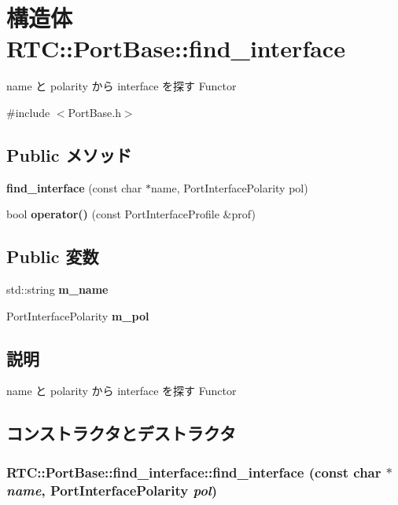 \section{構造体 RTC::PortBase::find\_\-interface}
\label{structRTC_1_1PortBase_1_1find__interface}


name と polarity から interface を探す Functor  




{\ttfamily \#include $<$PortBase.h$>$}

\subsection*{Public メソッド}
\begin{DoxyCompactItemize}
\item 
{\bf find\_\-interface} (const char $\ast$name, PortInterfacePolarity pol)
\item 
bool {\bf operator()} (const PortInterfaceProfile \&prof)
\end{DoxyCompactItemize}
\subsection*{Public 変数}
\begin{DoxyCompactItemize}
\item 
std::string {\bf m\_\-name}
\item 
PortInterfacePolarity {\bf m\_\-pol}
\end{DoxyCompactItemize}


\subsection{説明}
name と polarity から interface を探す Functor 

\subsection{コンストラクタとデストラクタ}
\subsubsection[{find\_\-interface}]{\setlength{\rightskip}{0pt plus 5cm}RTC::PortBase::find\_\-interface::find\_\-interface (const char $\ast$ {\em name}, \/  PortInterfacePolarity {\em pol})\hspace{0.3cm}{\ttfamily  [inline]}}\label{structRTC_1_1PortBase_1_1find__interface_ace212b36529cbb4723654674caba86d3}


